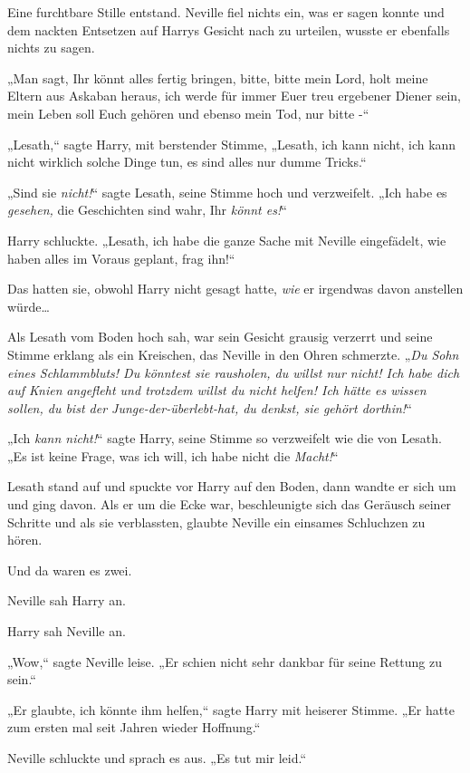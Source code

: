 {Eine furchtbare Stille entstand. Neville fiel nichts ein, was er sagen konnte und dem nackten Entsetzen auf Harrys Gesicht nach zu urteilen, wusste er ebenfalls nichts zu sagen.

„Man sagt, Ihr könnt alles fertig bringen, bitte, bitte mein Lord, holt meine Eltern aus Askaban heraus, ich werde für immer Euer treu ergebener Diener sein, mein Leben soll Euch gehören und ebenso mein Tod, nur bitte -“

„Lesath,“ sagte Harry, mit berstender Stimme, „Lesath, ich kann nicht, ich kann nicht wirklich solche Dinge tun, es sind alles nur dumme Tricks.“

„Sind sie \emph{nicht!}“ sagte Lesath, seine Stimme hoch und verzweifelt. „Ich habe es \emph{gesehen,} die Geschichten sind wahr, Ihr \emph{könnt es!}“

Harry schluckte. „Lesath, ich habe die ganze Sache mit Neville eingefädelt, wie haben alles im Voraus geplant, frag ihn!“

Das hatten sie, obwohl Harry nicht gesagt hatte, \emph{wie} er irgendwas davon anstellen würde…

Als Lesath vom Boden hoch sah, war sein Gesicht grausig verzerrt und seine Stimme erklang als ein Kreischen, das Neville in den Ohren schmerzte. „\emph{Du Sohn eines Schlammbluts! Du könntest sie rausholen, du willst nur nicht! Ich habe dich} \emph{auf Knien} \emph{angefleht und trotzdem willst du nicht helfen! Ich hätte es wissen sollen, du bist der Junge-der-überlebt-hat, du denkst, sie gehört dorthin!}“

„Ich \emph{kann nicht!}“ sagte Harry, seine Stimme so verzweifelt wie die von Lesath. „Es ist keine Frage, was ich will, ich habe nicht die \emph{Macht!}“

Lesath stand auf und spuckte vor Harry auf den Boden, dann wandte er sich um und ging davon. Als er um die Ecke war, beschleunigte sich das Geräusch seiner Schritte und als sie verblassten, glaubte Neville ein einsames Schluchzen zu hören.

Und da waren es zwei.

Neville sah Harry an.

Harry sah Neville an.

„Wow,“ sagte Neville leise. „Er schien nicht sehr dankbar für seine Rettung zu sein.“

„Er glaubte, ich könnte ihm helfen,“ sagte Harry mit heiserer Stimme. „Er hatte zum ersten mal seit Jahren wieder Hoffnung.“

Neville schluckte und sprach es aus. „Es tut mir leid.“

}
